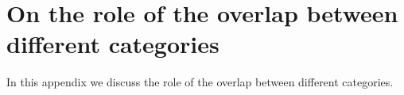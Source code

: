 
\section{On the role of the overlap between different categories}
\label{sec:overlap}

In this appendix we discuss the role of the overlap
between  different categories.
